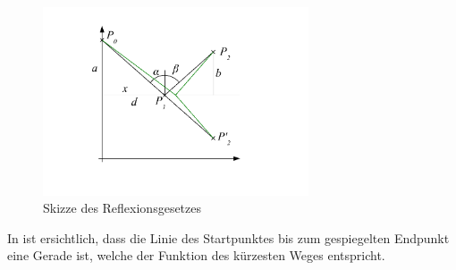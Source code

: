 \begin{figure}[H]
\begin{center}
	\includegraphics[width=0.7\textwidth]{./picture/Spiegelung.pdf}
	\caption{Skizze des Reflexionsgesetzes}
	\label{Ab:spiegelung}
\end{center}
\end{figure}
In  ist ersichtlich, dass die Linie des Startpunktes bis zum 
gespiegelten Endpunkt eine Gerade ist, welche der Funktion des kürzesten Weges entspricht.